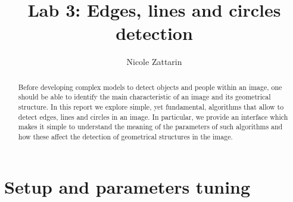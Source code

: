 \documentclass[twoside,onecolumn]{article}
\title{Lab 3: Edges, lines and circles detection } %
\author{Nicole Zattarin}
\date{}
\theoremstyle{definition}
\begin{document}
\maketitle

\begin{abstract}
Before developing complex models to detect objects and people within an image, one should be able to identify the main characteristic of an image and its geometrical structure. In this report we explore simple, yet fundamental, algorithms that allow to detect edges, lines and circles in an image. In particular, we provide an interface which makes it simple to understand the meaning of the parameters of such algorithms and how these affect the detection of geometrical structures in the image.
\end{abstract}
\section{Setup and parameters tuning}
\end{document}
